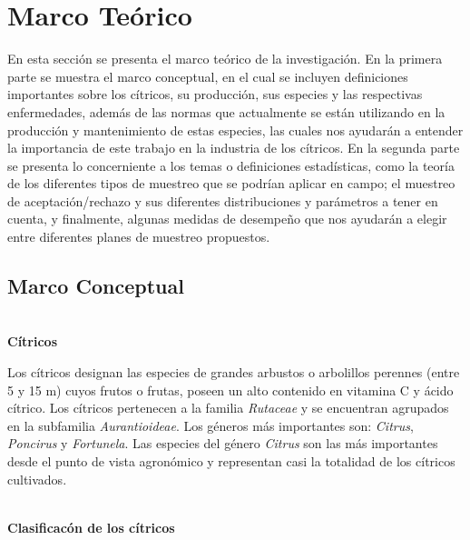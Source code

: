 \chapter{Marco Te\'{o}rico}
En esta secci\'{o}n se presenta el marco te\'{o}rico de la investigaci\'{o}n. En la primera parte se muestra el marco conceptual, en el cual se incluyen definiciones importantes sobre los c\'{i}tricos, su producci\'{o}n, sus especies y las respectivas enfermedades, adem\'{a}s de las normas que actualmente se est\'{a}n utilizando en la producci\'{o}n y mantenimiento de estas especies, las cuales nos ayudar\'{a}n a entender la importancia de este trabajo en la industria de los c\'{i}tricos. En la segunda parte se presenta lo concerniente a los temas o definiciones estad\'{i}sticas, como la teor\'{i}a de los diferentes tipos de muestreo que se podr\'{i}an aplicar en campo; el muestreo de aceptaci\'{o}n/rechazo y sus diferentes distribuciones y par\'{a}metros a tener en cuenta, y finalmente, algunas medidas de desempe\~{n}o que nos ayudar\'{a}n a elegir entre diferentes planes de muestreo propuestos.

\section{Marco Conceptual}
~\\\textbf{C\'{i}tricos}

Los c\'{i}tricos designan las especies de grandes arbustos o arbolillos perennes (entre 5 y 15 m) cuyos frutos o frutas, poseen un alto contenido en vitamina C y \'{a}cido c\'{i}trico. Los c\'{i}tricos pertenecen a la familia \textit{Rutaceae} y se encuentran agrupados en la subfamilia \textit{Aurantioideae}. Los g\'{e}neros m\'{a}s importantes son: \textit{Citrus}, \textit{Poncirus} y \textit{Fortunela}. Las especies del g\'{e}nero \textit{Citrus} son las m\'{a}s importantes desde el punto de vista agron\'{o}mico y representan casi la totalidad de los c\'{i}tricos cultivados.

~\\\textbf{Clasificac\'{o}n de los c\'{i}tricos}


